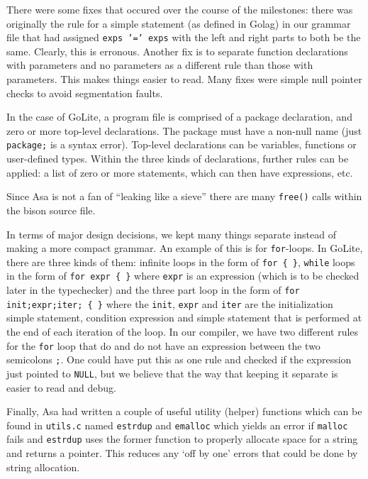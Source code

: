 \documentclass{article}
\begin{document}
There were some fixes that occured over the course of the milestones: there was originally the rule for a simple statement (as defined in Golag) in our grammar file that had assigned \texttt{exps '=' exps} with the left and right parts to both be the same. Clearly, this is erronous. Another fix is to separate function declarations with parameters and no parameters as a different rule than those with parameters. This makes things easier to read. Many fixes were simple null pointer checks to avoid segmentation faults.

In the case of GoLite, a program file is comprised of a package declaration, and zero or more top-level declarations. The package must have a non-null name (just \texttt{package;} is a syntax error). Top-level declarations can be variables, functions or user-defined types. Within the three kinds of declarations, further rules can be applied: a list of zero or more statements, which can then have expressions, etc. 

Since Asa is not a fan of ``leaking like a sieve'' there are many \texttt{free()} calls within the bison source file.

In terms of major design decisions, we kept many things separate instead of making a more compact grammar. An example of this is for \texttt{for}-loops. In GoLite, there are three kinds of them: infinite loops in the form of \texttt{for \{ \}}, \texttt{while} loops in the form of \texttt{for expr  \{ \}} where \texttt{expr} is an expression (which is to be checked later in the typechecker) and the three part loop in the form of \texttt{for init;expr;iter; \{ \}} where the \texttt{init}, \texttt{expr} and \texttt{iter} are the initialization simple statement, condition expression and simple statement that is performed at the end of each iteration of the loop. In our compiler, we have two different rules for the \texttt{for} loop that do and do not have an expression between the two semicolons \texttt{;}. One could have put this as one rule and checked if the expression just pointed to \texttt{NULL}, but we believe that the way that keeping it separate is easier to read and debug.

Finally, Asa had written a couple of useful utility (helper) functions which can be found in \texttt{utils.c} named \texttt{estrdup} and \texttt{emalloc} which yields an error if \texttt{malloc} fails and \texttt{estrdup} uses the former function to properly allocate space for a string and returns a pointer. This reduces any `off by one' errors that could be done by string allocation. 
\end{document}
